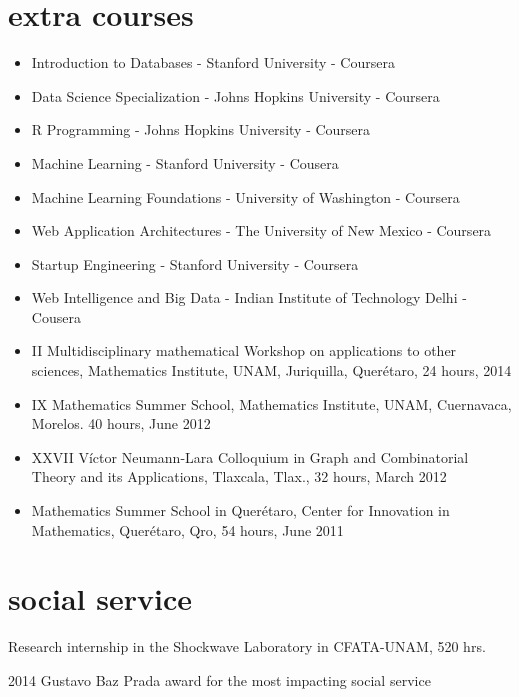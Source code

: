 \documentclass[]{friggeri-cv}
\begin{document}
\section{extra courses}
\begin{itemize}
\item Introduction to Databases - Stanford University - Coursera
\item Data Science Specialization - Johns Hopkins University - Coursera
\item R Programming - Johns Hopkins University - Coursera
\item Machine Learning - Stanford University - Cousera
\item Machine Learning Foundations - University of Washington - Coursera
\item Web Application Architectures - The University of New Mexico - Coursera
\item Startup Engineering - Stanford University - Coursera
\item Web Intelligence and Big Data - Indian Institute of Technology Delhi - Cousera
\item II Multidisciplinary mathematical Workshop on applications to other sciences,  Mathematics Institute, UNAM, Juriquilla, Quer\'{e}taro, 24 hours, 2014
\item IX Mathematics Summer School, Mathematics Institute, UNAM, Cuernavaca, Morelos. 40 hours, June 2012
\item XXVII  V\'{i}ctor Neumann-Lara  Colloquium in Graph and Combinatorial Theory and its Applications, Tlaxcala, Tlax., 32 hours, March 2012
\item Mathematics Summer School in Quer\'{e}taro, Center for Innovation in Mathematics, Quer\'{e}taro, Qro, 54 hours, June 2011
\end{itemize}

\section{social service}
Research internship in the Shockwave Laboratory in CFATA-UNAM, 520 hrs.

2014 Gustavo Baz Prada award for the most impacting social service
\end{document}
